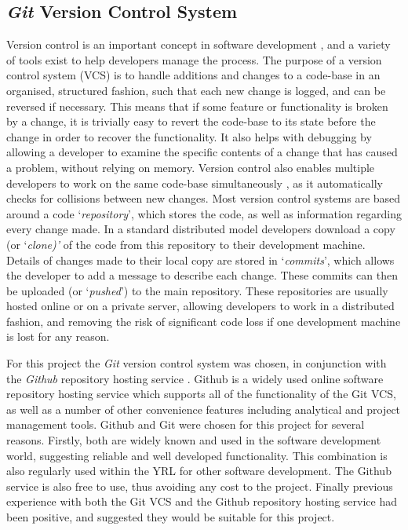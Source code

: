 \subsection{\textit{Git} Version Control System}
Version control is an important concept in software development \cite{VersionControl}, and a variety of tools exist to help developers manage the process. The purpose of a version control system (VCS) is to handle additions and changes to a code-base in an organised, structured fashion, such that each new change is logged, and can be reversed if necessary. This means that if some feature or functionality is broken by a change, it is trivially easy to revert the code-base to its state before the change in order to recover the functionality. It also helps with debugging by allowing a developer to examine the specific contents of a change that has caused a problem, without relying on memory. Version control also enables multiple developers to work on the same code-base simultaneously \cite{SVCPatent}, as it automatically checks for collisions between new changes. Most version control systems are based around a code `\textit{repository}', which stores the code, as well as information regarding every change made. In a standard distributed model developers download a copy (or `\textit{clone)'} of the code from this repository to their development machine. Details of changes made to their local copy are stored in `\textit{commits}', which allows the developer to add a message to describe each change. These commits can then be uploaded (or `\textit{pushed}') to the main repository. These repositories are usually hosted online or on a private server, allowing developers to work in a distributed fashion, and removing the risk of significant code loss if one development machine is lost for any reason.

For this project the \textit{Git} version control system \cite{ProGit} was chosen, in conjunction with the \textit{Github} repository hosting service \cite{Github}. Github is a widely used online software repository hosting service which supports all of the functionality of the Git VCS, as well as a number of other convenience features including analytical and project management tools. Github and Git were chosen for this project for several reasons. Firstly, both are widely known and used in the software development world, suggesting reliable and well developed functionality. This combination is also regularly used within the YRL for other software development. The Github service is also free to use, thus avoiding any cost to the project. Finally previous experience with both the Git VCS and the Github repository hosting service had been positive, and suggested they would be suitable for this project.

